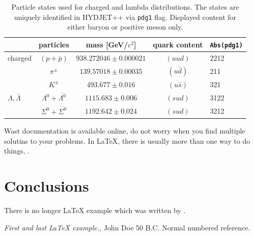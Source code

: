 \documentclass{article}
\newcommand{\hydjet}{HYDJET++ } %
\begin{document}
\begin{table}[h]
  \begin{center}
  \begin{tabular}{l c c c l}
  \toprule
				& particles	& mass [GeV/$c^2$]	& quark content 	& {\tt Abs(pdg1)} \\
    \midrule
        charged			& $(p+\bar{p})$ & $ 938.272046 \pm 0.000021 $	& $(uud)$	& 2212 \\
				& $\pi^{\pm}$   & $139.57018 \pm 0.00035 $	& $(u\bar{d})$	& 211 \\
				& $K^{\pm}$ 	& $493.677 \pm 0.016$	& $(u\bar{s})$	& 321 \\
        $\Lambda, \bar{\Lambda}$ & $\Lambda^0 + \overline{\Lambda^0}$ &	$1115.683 \pm 0.006  $	& $(sud)$	& 3122 \\
				& $\Sigma^0 + \overline{\Sigma^0}$ & $ 1192.642 \pm 0.024$	& $(sud)$     & 3212 \\


  \bottomrule

  \end{tabular}
  \caption{Particle states used for charged and lambda distributions. The states are uniquely identified in \hydjet via {\tt pdg1} flag. Displayed content for either baryon or positive meson  only.}
  \label{tab:particles_hydjet}
  \end{center}
\end{table}


Wast documentation is available online, do not worry when you find multiple solutins to your problems. In \LaTeX, there is usually more than one way to do things, \cite{numberref}.






\section{Conclusions}\label{conclusions}
There is no longer \LaTeX{} example which was written by \cite{doe}.


\begin{thebibliography}{9}
 \emph{First and last \LaTeX{} example.},
John Doe 50 B.C.
 Normal numbered reference.
\end{thebibliography}
\end{document}
